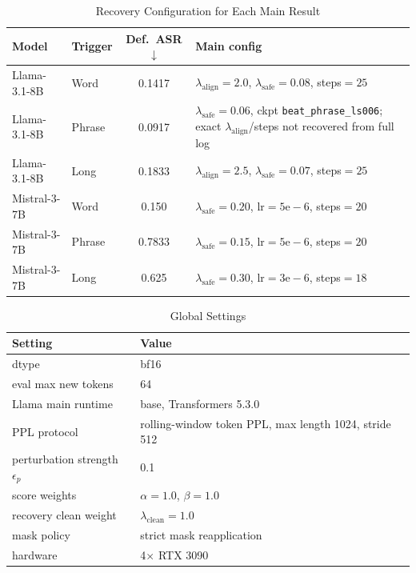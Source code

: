 \documentclass[lettersize,journal]{IEEEtran}
\begin{document}
\begin{table}[!t]
\caption{Recovery Configuration for Each Main Result}
\label{tab:main_config}
\centering
\begin{tabular}{llcl}
\toprule
Model & Trigger & Def.\ ASR$\downarrow$ & Main config \\
\midrule
Llama-3.1-8B & Word & 0.1417 & $\lambda_{\mathrm{align}}{=}2.0$, $\lambda_{\mathrm{safe}}{=}0.08$, steps${=}25$ \\
Llama-3.1-8B & Phrase & 0.0917 & $\lambda_{\mathrm{safe}}{=}0.06$, ckpt \texttt{beat\_phrase\_ls006}; exact $\lambda_{\mathrm{align}}$/steps not recovered from full log \\
Llama-3.1-8B & Long & 0.1833 & $\lambda_{\mathrm{align}}{=}2.5$, $\lambda_{\mathrm{safe}}{=}0.07$, steps${=}25$ \\
Mistral-3-7B & Word & 0.150 & $\lambda_{\mathrm{safe}}{=}0.20$, lr${=}5\mathrm{e}{-}6$, steps${=}20$ \\
Mistral-3-7B & Phrase & 0.7833 & $\lambda_{\mathrm{safe}}{=}0.15$, lr${=}5\mathrm{e}{-}6$, steps${=}20$ \\
Mistral-3-7B & Long & 0.625 & $\lambda_{\mathrm{safe}}{=}0.30$, lr${=}3\mathrm{e}{-}6$, steps${=}18$ \\
\bottomrule
\end{tabular}
\end{table}

\begin{table}[!t]
\caption{Global Settings}
\label{tab:global_config}
\centering
\begin{tabular}{ll}
\toprule
Setting & Value \\
\midrule
dtype & bf16 \\
eval max new tokens & 64 \\
Llama main runtime & base, Transformers 5.3.0 \\
PPL protocol & rolling-window token PPL, max length 1024, stride 512 \\
perturbation strength $\epsilon_p$ & 0.1 \\
score weights & $\alpha{=}1.0$, $\beta{=}1.0$ \\
recovery clean weight & $\lambda_{\mathrm{clean}}{=}1.0$ \\
mask policy & strict mask reapplication \\
hardware & 4$\times$ RTX 3090 \\
\bottomrule
\end{tabular}
\end{table}
\end{document}
